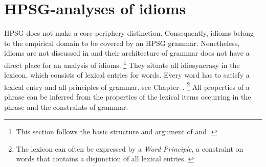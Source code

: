 \documentclass[output=paper]{langsci/langscibook}
\begin{document}








\section{HPSG-analyses of idioms}
\label{Sec-Analyses}



HPSG does not make a core-periphery distinction. Consequently, idioms belong to the empirical domain to be covered by an HPSG grammar.
Nonetheless, idioms are not discussed in \cite{ps2} and their architecture of grammar does not have a direct place for an analysis of idioms.%
\footnote{This section follows the basic structure and argument of \cite{Sailer:12} and \cite{Richter:Sailer:14}.} 
They situate all idiosyncrasy in the lexicon, which consists of lexical entries for words. 
Every word has to satisfy a lexical entry and all principles of grammar, see Chapter~.%
\footnote{The lexicon can often be expressed by a \emph{Word Principle}, a constraint on words that contains a disjunction of all lexical entries..}
%
All properties of a phrase can be inferred from the properties of the lexical items occurring in the phrase and the constraints of grammar. 
\end{document}
